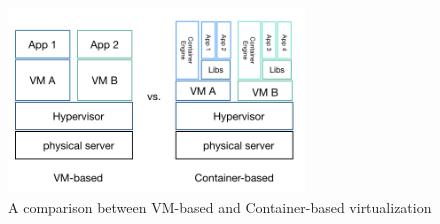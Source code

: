 \begin{figure}
	\centering
	\includegraphics[width=0.7\textwidth]{pics/comparison.png}
	\caption{A comparison between VM-based and Container-based virtualization}
	\label{fig:comparison}
\end{figure}





 
